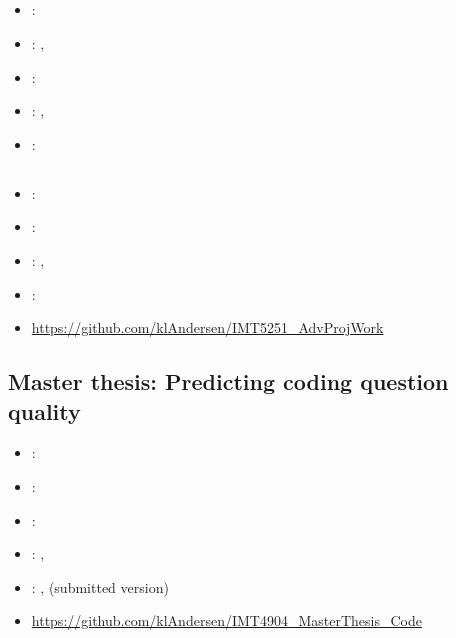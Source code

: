 \label{sec:section5}

\subsection[Global Software Development]{}
\label{sec:glob_soft_dev}
\begin{itemize} 
	\item {}: 
	\item {}: , 
	\item {}: 
	\item {}: , 
	\item {}: 
\end{itemize} 

\subsection[Advanced Project Work]{}
\label{sec:adv_proj_work}
\begin{itemize} 
	\item {}: 
	\item {}: 
	\item {}: , 
	\item {}: 
	\item {} \url{https://github.com/klAndersen/IMT5251_AdvProjWork}
\end{itemize} 

\subsection{Master thesis: Predicting coding question quality}
\label{sec:master_thesis}
\begin{itemize} 
	\item {}: 
	\item {}: 
	\item {}: 
	\item {}: , 
	\item {}: ,  (submitted version)
	\item {} \url{https://github.com/klAndersen/IMT4904_MasterThesis_Code}
\end{itemize} 
